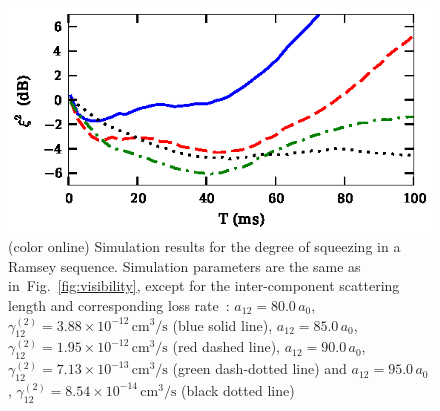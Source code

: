 \documentclass[aps,prl,twocolumn,showpacs,amsmath,amssymb,superscriptaddress,flushbottom,noraggedfooter]{revtex4-1}
\newcommand{\figref}[1]{Fig.~\ref{#1}}
\begin{document}
\begin{figure}
	\includegraphics{ramsey_squeezing.eps}

	\caption[]{(color online) Simulation results for the degree of squeezing in a Ramsey sequence.
	Simulation parameters are the same as in~\figref{fig:visibility},
	except for the inter-component scattering length and corresponding loss rate~\cite{Kaufman2009}:
	$a_{12} = 80.0\,a_0$, $\gamma^{(2)}_{12} = 3.88 \times 10^{-12}\,\mathrm{cm^3/s}$ (blue solid line),
	$a_{12} = 85.0\,a_0$, $\gamma^{(2)}_{12} = 1.95 \times 10^{-12}\,\mathrm{cm^3/s}$ (red dashed line),
	$a_{12} = 90.0\,a_0$, $\gamma^{(2)}_{12} = 7.13 \times 10^{-13}\,\mathrm{cm^3/s}$ (green dash-dotted line) and
	$a_{12} = 95.0\,a_0$, $\gamma^{(2)}_{12} = 8.54 \times 10^{-14}\,\mathrm{cm^3/s}$ (black dotted line)}

	\label{fig:squeezing}
\end{figure}
\end{document}
